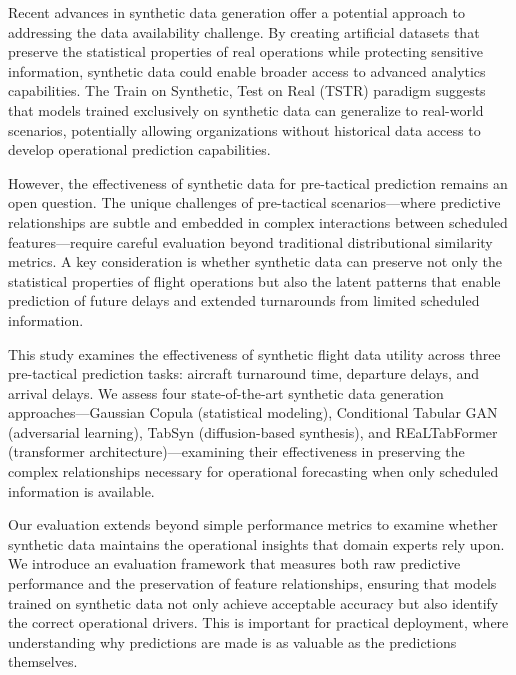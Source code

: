\documentclass[conference]{IEEEtran}
\begin{document}
Recent advances in synthetic data generation offer a potential approach to addressing the data availability challenge. By creating artificial datasets that preserve the statistical properties of real operations while protecting sensitive information, synthetic data could enable broader access to advanced analytics capabilities. The Train on Synthetic, Test on Real (TSTR) paradigm suggests that models trained exclusively on synthetic data can generalize to real-world scenarios, potentially allowing organizations without historical data access to develop operational prediction capabilities.

However, the effectiveness of synthetic data for pre-tactical prediction remains an open question. The unique challenges of pre-tactical scenarios—where predictive relationships are subtle and embedded in complex interactions between scheduled features—require careful evaluation beyond traditional distributional similarity metrics. A key consideration is whether synthetic data can preserve not only the statistical properties of flight operations but also the latent patterns that enable prediction of future delays and extended turnarounds from limited scheduled information.

This study examines the effectiveness of synthetic flight data utility across three pre-tactical prediction tasks: aircraft turnaround time, departure delays, and arrival delays. We assess four state-of-the-art synthetic data generation approaches—Gaussian Copula (statistical modeling), Conditional Tabular GAN (adversarial learning), TabSyn (diffusion-based synthesis), and REaLTabFormer (transformer architecture)—examining their effectiveness in preserving the complex relationships necessary for operational forecasting when only scheduled information is available.

Our evaluation extends beyond simple performance metrics to examine whether synthetic data maintains the operational insights that domain experts rely upon. We introduce an evaluation framework that measures both raw predictive performance and the preservation of feature relationships, ensuring that models trained on synthetic data not only achieve acceptable accuracy but also identify the correct operational drivers. This is important for practical deployment, where understanding why predictions are made is as valuable as the predictions themselves.
\end{document}
